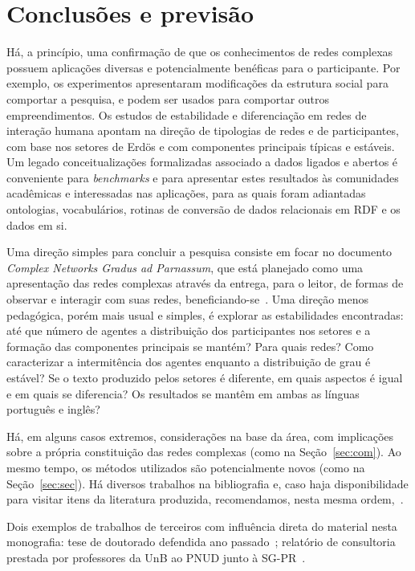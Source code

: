 \documentclass[a4paper,openright,12pt]{report} %
\begin{document}
\chapter{Conclusões e previsão}\label{sec:con}
Há, a princípio, uma confirmação de que os conhecimentos de redes complexas
possuem aplicações diversas e potencialmente benéficas para o participante.
Por exemplo, os experimentos apresentaram modificações da estrutura social para comportar a pesquisa, e podem ser usados para comportar outros empreendimentos. Os estudos de estabilidade e diferenciação em redes de interação humana apontam na direção de tipologias de redes e de participantes, com base nos setores de Erdös e com componentes principais típicas e estáveis.
Um legado conceitualizações formalizadas associado a dados ligados e abertos é conveniente para \emph{benchmarks} e para apresentar estes resultados às comunidades acadêmicas e interessadas nas aplicações, para as quais foram adiantadas ontologias, vocabulários, rotinas de conversão de dados relacionais em RDF e os dados em si.

Uma direção simples para concluir a pesquisa
consiste em focar no documento \emph{Complex Networks Gradus ad Parnassum},
que está planejado como uma apresentação das redes complexas através
da entrega, para o leitor, de formas de observar e interagir com suas redes, beneficiando-se~\cite{gradus}.
Uma direção menos pedagógica, porém mais usual e simples, é
explorar as estabilidades encontradas: até que número de
agentes a distribuição dos participantes nos setores e a
formação das componentes principais se mantém? Para quais redes?
Como caracterizar a intermitência dos agentes enquanto a distribuição de
grau é estável? Se o texto produzido pelos setores é diferente,
em quais aspectos é igual e em quais se diferencia?
Os resultados se mantêm em ambas as línguas português e inglês?

Há, em alguns casos extremos, considerações na base da área,
com implicações sobre a própria constituição das redes complexas
(como na Seção~\ref{sec:com}).
Ao mesmo tempo, os métodos utilizados são potencialmente novos (como na Seção~\ref{sec:sec}).
Há diversos trabalhos na bibliografia e,
caso haja disponibilidade para visitar itens da literatura
produzida, recomendamos, nesta mesma ordem,~\cite{timeS,pnud5,ensaio,gmanePack,4hubs}.

Dois exemplos de trabalhos de terceiros 
com influência direta do material nesta monografia:
tese de doutorado defendida ano passado~\cite{chandra};
relatório de consultoria prestada por professores da UnB ao PNUD
junto à SG-PR~\cite{paulo6}.
\end{document}
